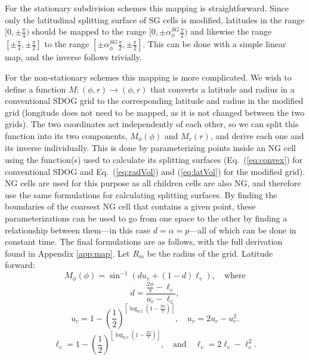 For the stationary subdivision schemes this mapping is straightforward.
Since only the latitudinal splitting surface of SG cells is modified, latitudes in the range $[0, \pm\frac{\pi}{4})$ should be mapped to the range $[0, \pm\alpha_{\phi}^{SG} \frac{\pi}{2})$ and likewise the range $[\pm\frac{\pi}{4}, \pm\frac{\pi}{2}]$ to the range $[\pm\alpha_{\phi}^{SG} \frac{\pi}{2}, \pm\frac{\pi}{2}]$.
This can be done with a simple linear map, and the inverse follows trivially.


For the non-stationary schemes this mapping is more complicated.
We wish to define a function $M \colon (\phi, r) \rightarrow (\phi, r)$ that converts a latitude and radius in a conventional SDOG grid to the corresponding latitude and radius in the modified grid (longitude does not need to be mapped, as it is not changed between the two grids).
The two coordinates act independently of each other, so we can split this function into its two components, $M_{\phi}(\phi)$ and $M_{r}(r)$, and derive each one and its inverse individually.
This is done by parameterizing points inside an NG cell using the function(s) used to calculate its splitting surfaces (Eq.~(\ref{eq:convex}) for conventional SDOG and Eq.~(\ref{eq:radVol}) and (\ref{eq:latVol}) for the modified grid).
NG cells are used for this purpose as all children cells are also NG, and therefore use the same formulations for calculating splitting surfaces.
By finding the boundaries of the coarsest NG cell that contains a given point, these parameterizations can be used to go from one space to the other by finding a relationship between them---in this case $d = \alpha = p$---all of which can be done in constant time.
The final formulations are as follows, with the full derivation found in Appendix \ref{app:map}.
Let $R_m$ be the radius of the grid.
Latitude forward:
%
\begin{equation*}
M_{\phi}(\phi) = \sin^{-1} \left( d u_{v} + \left( 1 - d \right) \ell_{v} \right), \quad \text{where}
\end{equation*}
%
\begin{equation*}
d = \frac{\frac{2\phi}{\pi} - \ell_{c}}{u_{c} - \ell_{c}},
\end{equation*}
%
\begin{equation*}
u_{c} = 1 - \left( \frac{1}{2} \right)^{ \left\lceil \log_{0.5} \left( 1 - \frac{2\phi}{\pi} \right) \right\rceil }, \quad u_{v} = 2 u_{c} - u_{c}^{2}.
\end{equation*}
%
\begin{equation*}
\ell_{c} = 1 - \left( \frac{1}{2} \right)^{ \left\lfloor \log_{0.5} \left( 1 - \frac{2\phi}{\pi} \right) \right\rfloor }, \quad \text{and} \quad \ell_{v} = 2 \ell_{c} - \ell_{c}^{2}.
\end{equation*}
